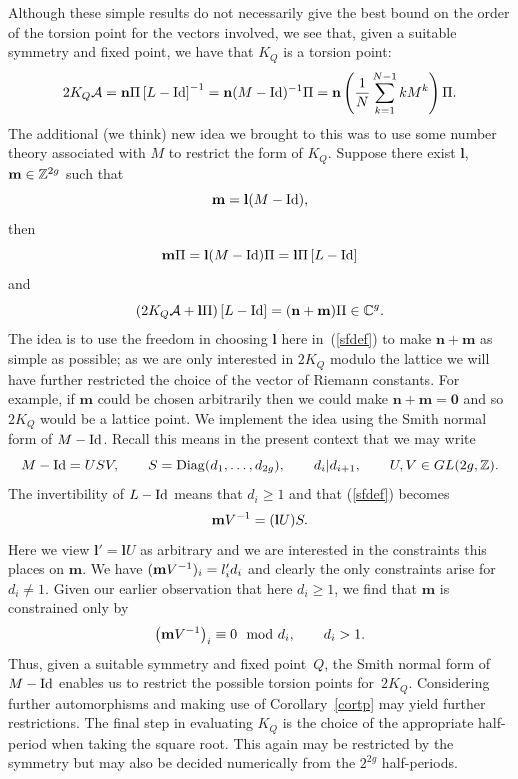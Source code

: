 \documentclass[pdftex]{sigma}
\numberwithin{equation}{section}
\def\diag{\mathop{\rm Diag}\nolimits}
\def\id{\mathop{\rm Id}\nolimits}
\begin{document}
Although these simple results do not necessarily give
the best bound on the order of the torsion point for the vectors
involved, we see that, given a
suitable symmetry and f\/ixed point, we have that $K_Q$ is a torsion
point:
\begin{equation*}
2K_Q\mathcal{A}=\mathbf{n}\Pi\left[L-\id\right]\sp{-1}
=\mathbf{n}(M-\id)\sp{-1}\Pi=\mathbf{n}\left(\frac{1}{N}\sum_{k=1}\sp{N-1}
kM\sp{k}\right)\Pi.
\end{equation*}
The additional (we think) new idea we brought to this was to use some number theory
associated with $M$ to restrict the form of $K_Q$. Suppose
there exist $\mathbf{l}$, $\mathbf{m}\in\mathbb{Z}\sp{2g}$ such
that
\begin{equation}\label{sfdef}
\mathbf{m}=\mathbf{l}(M-\id),
\end{equation}
then
\[
\mathbf{m}\Pi=\mathbf{l}(M-\id)\Pi=
 \mathbf{l}\Pi\left[L-\id\right]
 \]
 and
\[
\left(2K_Q\mathcal{A}+\mathbf{l}\Pi\right)\left[{L}-\id\right]=(\mathbf{n}+\mathbf{m})\Pi  \in
\mathbb{C}\sp{g}.
\] The idea is to use the freedom in choosing
$\mathbf{l}$ here in~(\ref{sfdef}) to make $\mathbf{n}+\mathbf{m}$
as simple as possible; as we are only interested in $2K_Q$ modulo
the lattice we will have further restricted the choice of the
vector of Riemann constants. For example, if $\mathbf{m}$ could be
chosen arbitrarily then we could make
$\mathbf{n}+\mathbf{m}=\mathbf{0}$ and so $2K_Q$ would be a
lattice point. We implement the idea using the Smith normal
form of $M-\id$. Recall this means in the present context that we
may write
\[
M-\id=USV, \qquad S=\diag(d_1,\ldots,d_{2g}),\qquad d_i|d_{i+1},
\qquad U,V\in GL(2g,\mathbb{Z}).
\] The invertibility of $L-\id$ means
that $d_i\ge1$ and that (\ref{sfdef}) becomes
\[
\mathbf{m}V\sp{-1}=(\mathbf{l}U)S.
\]
Here we view $\mathbf{l}'=\mathbf{l}U$ as arbitrary and we are
interested in the constraints this places on $\mathbf{m}$. We have
$(\mathbf{m}V\sp{-1})_i=l_i'd_i$ and clearly the only constraints
arise for $d_i\ne1$. Given our earlier observation that here
$d_i\ge1$, we f\/ind that $\mathbf{m}$ is constrained only by
\[
\big(\mathbf{m}V\sp{-1}\big)_i\equiv0 \mod d_i,\qquad d_i>1.
\]
Thus, given a suitable symmetry and f\/ixed point~$Q$, the Smith
normal form of $M-\id$ enables us to restrict the possible torsion
points for~$2K_Q$. Considering further automorphisms and making
use of Corollary~\ref{cortp} may yield further restrictions. The f\/inal
step in evaluating $K_Q$ is the choice of the appropriate
half-period when taking the square root. This again may be
restricted by the symmetry but may also be decided numerically from
the $2^{2g}$ half-periods.
\end{document}
